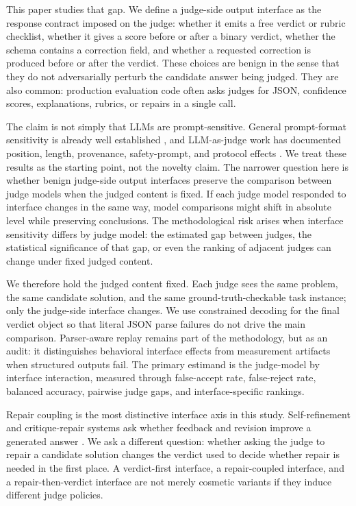 \documentclass[journal]{IEEEtran}
\begin{document}
This paper studies that gap. We define a judge-side output interface as the response contract imposed on the judge: whether it emits a free verdict or rubric checklist, whether it gives a score before or after a binary verdict, whether the schema contains a correction field, and whether a requested correction is produced before or after the verdict. These choices are benign in the sense that they do not adversarially perturb the candidate answer being judged. They are also common: production evaluation code often asks judges for JSON, confidence scores, explanations, rubrics, or repairs in a single call.

The claim is not simply that LLMs are prompt-sensitive. General prompt-format sensitivity is already well established \citep{sclar2024spurious, mizrahi2024multiprompt}, and LLM-as-judge work has documented position, length, provenance, safety-prompt, and protocol effects \citep{zheng2024judging, dubois2024length, eiras2025know, zhang2026judgeconfig, tripathi2025pairwise}. We treat these results as the starting point, not the novelty claim. The narrower question here is whether benign judge-side output interfaces preserve the comparison between judge models when the judged content is fixed. If each judge model responded to interface changes in the same way, model comparisons might shift in absolute level while preserving conclusions. The methodological risk arises when interface sensitivity differs by judge model: the estimated gap between judges, the statistical significance of that gap, or even the ranking of adjacent judges can change under fixed judged content.

We therefore hold the judged content fixed. Each judge sees the same problem, the same candidate solution, and the same ground-truth-checkable task instance; only the judge-side interface changes. We use constrained decoding for the final verdict object so that literal JSON parse failures do not drive the main comparison. Parser-aware replay remains part of the methodology, but as an audit: it distinguishes behavioral interface effects from measurement artifacts when structured outputs fail. The primary estimand is the judge-model by interface interaction, measured through false-accept rate, false-reject rate, balanced accuracy, pairwise judge gaps, and interface-specific rankings.

Repair coupling is the most distinctive interface axis in this study. Self-refinement and critique-repair systems ask whether feedback and revision improve a generated answer \citep{madaan2023selfrefine, gou2024critic, lin2024criticbench}. We ask a different question: whether asking the judge to repair a candidate solution changes the verdict used to decide whether repair is needed in the first place. A verdict-first interface, a repair-coupled interface, and a repair-then-verdict interface are not merely cosmetic variants if they induce different judge policies.
\end{document}
